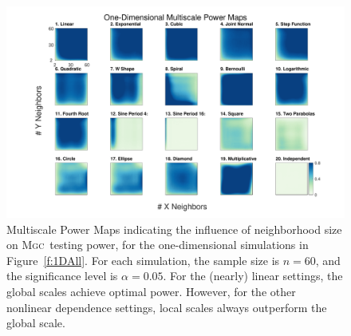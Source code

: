 \documentclass[11pt]{article}
\providecommand{\sct}[1]{{\normalfont\textsc{#1}}}
\newcommand{\Mgc}{\sct{Mgc}}
\begin{document}
\begin{figure}[htbp]
\includegraphics[width=1.0\textwidth,trim={3cm 0.5cm 2.5cm 0.5cm},clip]{Figures/Fig1DHeat}
\caption{Multiscale Power Maps indicating the influence of neighborhood size on \Mgc~testing power, for the one-dimensional simulations in Figure~\ref{f:1DAll}. For each simulation,  the sample size is $n=60$, and the significance level is $\alpha=0.05$. For the (nearly) linear settings, the global scales achieve optimal power.  However, for the other nonlinear dependence settings, local scales always outperform the global scale.}
\label{f:powermaps1}
\end{figure}
\end{document}
